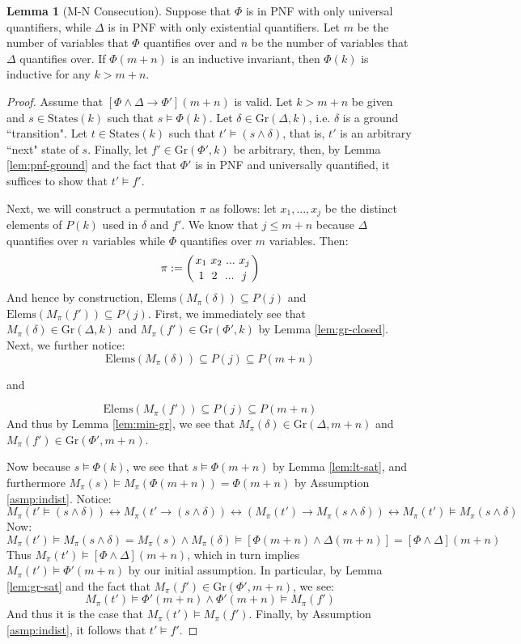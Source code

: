 \documentclass[12pt]{article}
\theoremstyle{definition}
\newtheorem{lemma}{Lemma}
\theoremstyle{remark}
\newcommand{\msp}{\text{ }}
\newcommand{\states}{\text{States}}
\newcommand{\gr}{\text{Gr}}
\newcommand{\elems}{\text{Elems}}
\newcommand{\perm}{\genfrac{}{}{0pt}{}}
\begin{document}
\begin{lemma}[M-N Consecution]
  Suppose that $\Phi$ is in PNF with only universal quantifiers, while $\Delta$ is in PNF with only existential quantifiers.  Let $m$ be the number of variables that $\Phi$ quantifies over and $n$ be the number of variables that $\Delta$ quantifies over.  If $\Phi(m+n)$ is an inductive invariant, then $\Phi(k)$ is inductive for any $k>m+n$.
\end{lemma}
\begin{proof}
  Assume that $[\Phi\land\Delta \rightarrow \Phi'](m+n)$ is valid.  Let $k>m+n$ be given and $s \in \states(k)$ such that $s \models \Phi(k)$.  Let $\delta \in \gr(\Delta,k)$, i.e. $\delta$ is a ground ``transition".  Let $t \in \states(k)$ such that $t' \models (s \land \delta)$, that is, $t'$ is an arbitrary ``next" state of $s$.  Finally, let $f' \in \gr(\Phi',k)$ be arbitrary, then, by Lemma \ref{lem:pnf-ground} and the fact that $\Phi'$ is in PNF and universally quantified, it suffices to show that $t' \models f'$.

  Next, we will construct a permutation $\pi$ as follows: let $x_1,...,x_j$ be the distinct elements of $P(k)$ used in $\delta$ and $f'$.  We know that $j \leq m+n$ because $\Delta$ quantifies over $n$ variables while $\Phi$ quantifies over $m$ variables.  Then:
  $$\pi := \left( \perm{x_1 \msp x_2 \msp ... \msp x_j}{1 \msp\msp 2 \msp\msp ... \msp\msp j} \right)$$
  And hence by construction, $\elems(M_\pi(\delta)) \subseteq P(j)$ and $\elems(M_\pi(f')) \subseteq P(j)$.  First, we immediately see that $M_\pi(\delta) \in \gr(\Delta,k)$ and $M_\pi(f') \in \gr(\Phi',k)$ by Lemma \ref{lem:gr-closed}.  Next, we further notice:
  $$\elems(M_\pi(\delta)) \subseteq P(j) \subseteq P(m+n)$$
  \begin{center}
    and
  \end{center}
  $$\elems(M_\pi(f')) \subseteq P(j) \subseteq P(m+n)$$
  And thus by Lemma \ref{lem:min-gr}, we see that $M_\pi(\delta) \in \gr(\Delta,m+n)$ and $M_\pi(f') \in \gr(\Phi',m+n)$.

  Now because $s \models \Phi(k)$, we see that $s \models \Phi(m+n)$ by Lemma \ref{lem:lt-sat}, and furthermore $M_\pi(s) \models M_\pi(\Phi(m+n)) = \Phi(m+n)$ by Assumption \ref{asmp:indist}.  Notice:
  $$M_\pi(t' \models (s \land \delta)) \leftrightarrow M_\pi(t' \rightarrow (s \land \delta)) \leftrightarrow (M_\pi(t') \rightarrow M_\pi(s \land \delta)) \leftrightarrow M_\pi(t') \models M_\pi(s \land \delta)$$
  Now:
  $$M_\pi(t') \models M_\pi(s \land \delta) = M_\pi(s) \land M_\pi(\delta) \models [\Phi(m+n) \land \Delta(m+n)] = [\Phi\land\Delta](m+n)$$
  Thus $M_\pi(t') \models [\Phi\land\Delta](m+n)$, which in turn implies $M_\pi(t') \models \Phi'(m+n)$ by our initial assumption.  In particular, by Lemma \ref{lem:gr-sat} and the fact that $M_\pi(f') \in \gr(\Phi',m+n)$, we see:
  $$M_\pi(t') \models \Phi'(m+n) \land \Phi'(m+n) \models M_\pi(f')$$
  And thus it is the case that $M_\pi(t') \models M_\pi(f')$.  Finally, by Assumption \ref{asmp:indist}, it follows that $t' \models f'$.
\end{proof}
\end{document}
